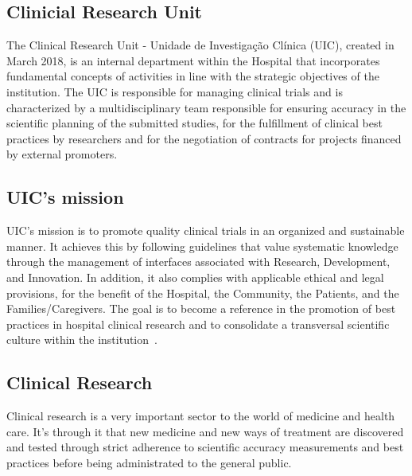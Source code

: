 \subsection{Clinicial Research Unit}
The Clinical Research Unit - Unidade de Investigação Clínica
(UIC), created in March 2018, is an internal department within the
Hospital that incorporates fundamental concepts of activities in line
with the strategic objectives of the institution. The UIC is responsible
for managing clinical trials and is characterized by a
multidisciplinary team responsible for ensuring accuracy in the
scientific planning of the submitted studies, for the fulfillment of
clinical best practices by researchers and for the negotiation of
contracts for projects financed by external promoters.\\

\subsection{UIC's mission}
UIC's mission is to promote quality clinical trials in an organized and sustainable manner. It achieves this by following guidelines that value systematic knowledge through the management of interfaces associated with Research, Development, and Innovation. In addition, it also complies with applicable ethical and legal provisions, for the benefit of the Hospital, the Community, the Patients, and the Families/Caregivers.
The goal is to become a reference in the promotion of best practices in hospital clinical research and to consolidate a transversal scientific culture within the institution~\cite{hff-uic}.

\subsection{Clinical Research}
Clinical research is a very important sector to the world of medicine and
health care. It's through it that new medicine and new ways of
treatment are discovered and tested through strict adherence to 
scientific accuracy measurements and best practices before being
administrated to the general public. 

